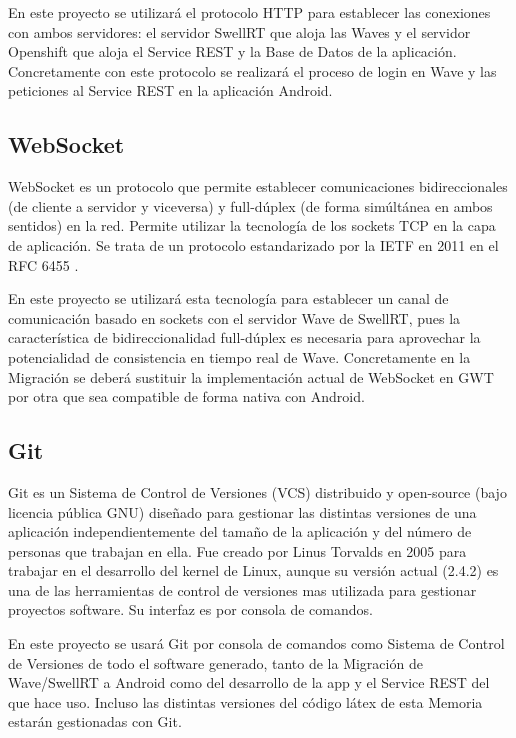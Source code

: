 	En este proyecto se utilizará el protocolo HTTP para establecer las conexiones con ambos servidores: el servidor SwellRT que aloja las Waves y el servidor Openshift que aloja el Service REST y la Base de Datos de la aplicación. Concretamente con este protocolo se realizará el proceso de login en Wave y las peticiones al Service REST en la aplicación Android.
    
    \subsection{WebSocket}\label{ssec:websocket}
    
	WebSocket \cite{ref:webSocket_ref} es un protocolo que permite establecer comunicaciones bidireccionales (de cliente a servidor y viceversa) y full-dúplex (de forma simúltánea en ambos sentidos) en la red. Permite utilizar la tecnología de los sockets TCP en la capa de aplicación.  Se trata de un protocolo estandarizado por la IETF en 2011 en el RFC 6455 \cite{ref:webSocket_ref}. 
	
	En este proyecto se utilizará esta tecnología para establecer un canal de comunicación basado en sockets con el servidor Wave de SwellRT, pues la característica de bidireccionalidad full-dúplex es necesaria para aprovechar la potencialidad de consistencia en tiempo real de Wave. Concretamente en la Migración se deberá sustituir la implementación actual de WebSocket en GWT por otra que sea compatible de forma nativa con Android.
    
    \subsection{Git}\label{ssec:git} 
    
	Git \cite{ref:git} es un Sistema de Control de Versiones (VCS) distribuido y open-source (bajo licencia pública GNU) diseñado para gestionar las distintas versiones de una aplicación independientemente del tamaño de la aplicación y del número de personas que trabajan en ella. Fue creado por Linus Torvalds en 2005 para trabajar en el desarrollo del kernel de Linux, aunque  su versión actual (2.4.2) es una de las herramientas  de control de versiones mas utilizada para gestionar proyectos software. Su interfaz es por consola de comandos.
	
	En este proyecto se usará Git por consola de comandos como Sistema de Control de Versiones de todo el software generado, tanto de la Migración de Wave/SwellRT a Android como del desarrollo de la app y el Service REST del que hace uso. Incluso las distintas versiones del código látex de esta Memoria estarán gestionadas con Git.
     
